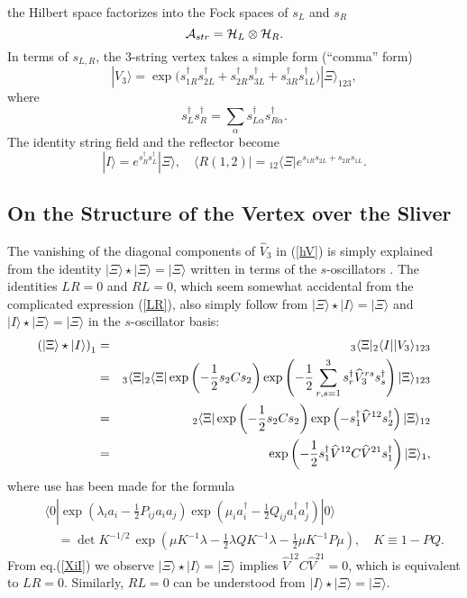\documentclass[a4paper,12pt]{article}
\def\hf{{1\over 2}}
\def\bra{\langle}
\def\ket{\rangle}
\def\lf{\left}
\def\ri{\right}
\def\h#1{\widehat{#1}}
\def\al{\alpha}
\def\tens{\otimes}
\def\sd{s^{\dagger}}
\newcommand{\nn}{\nonumber \\}
\begin{document}
the Hilbert space factorizes into the Fock spaces of $s_L$ and $s_R$
\begin{equation}
{\cal A}_{str}={\cal H}_L\tens {\cal H}_R.
\end{equation}
In terms of $s_{L,R}$, the 3-string vertex takes a simple
form (``comma'' form)
\begin{equation}
|V_3\ket=\exp\Big(\sd_{1R}\sd_{2L}+\sd_{2R}\sd_{3L}+\sd_{3R}\sd_{1L}
\Big)|\Xi\ket_{123} ,
\end{equation}
where
\begin{equation}
 \sd_L\sd_R=\sum_{\al}\sd_{L\al}\sd_{R\al}.
\end{equation}
The identity string field and the reflector become
\begin{equation}
|I\ket=e^{\sd_R\sd_L}|\Xi\ket,\quad 
\bra R(1,2)|={}_{12}\bra\Xi|e^{s_{1R}s_{2L}+s_{2R}s_{1L}}. 
\end{equation}


\subsection{On the Structure of the Vertex over the Sliver}

The vanishing of the diagonal components of $\h{V}_3$
in (\ref{hV}) is simply explained from the
identity
$|\Xi\ket \star |\Xi\ket = |\Xi\ket$ 
written in terms of the
$s$-oscillators
\cite{KosteleckyPotting}.
The identities 
$LR = 0$ and $RL = 0$,
which seem somewhat accidental from the complicated
expression (\ref{LR}),
also simply follow from
$|\Xi\ket \star | I \ket = |\Xi\ket$ and
$| I \ket \star | \Xi \ket = |\Xi\ket$ 
in the $s$-oscillator basis:
\begin{eqnarray}
 \label{XiI}
\lf(|\Xi\ket \star |I\ket \ri)_1
&=&
{}_3\bra \Xi |{}_2\bra I | | V_3 \ket_{123} \nn
&=&
{}_3\bra \Xi |{}_2\bra \Xi|\exp\lf(-\frac{1}{2}s_2 C s_2 \ri)
\exp\lf(-\hf \sum_{r,s=1}^3\sd_r\h{V}^{rs}_3\sd_s\ri) 
|\Xi\ket_{123} \nn
&=&
{}_2\bra \Xi|
\exp\lf(-\frac{1}{2}s_2 C s_2 \ri)
\exp\lf(-s_1^{\dagger}\h{V}^{12}s_2^\dagger\ri) |\Xi\ket_{12} \nn
&=&\exp\lf(-\hf s_1^\dagger \h{V}^{12} C \h{V}^{21} s_1^{\dagger} \ri)
|\Xi\ket_1 ,
\end{eqnarray}
where use has been made for the formula
\begin{eqnarray}
&&\bra 0| 
\exp\lf(\lambda_i a_i -\frac{1}{2} P_{ij} a_i a_j \ri)
\exp\lf(\mu_i a_i^{\dagger} -\frac{1}{2} Q_{ij} a_i^{\dagger} a_j^{\dagger}\ri)
| 0 \ket \nn
&&\quad=
\det K^{-1/2}\,
\exp\lf(\mu K^{-1}\lambda -\frac{1}{2} \lambda Q K^{-1} \lambda
-\frac{1}{2} \mu  K^{-1} P \mu \ri),\quad
K \equiv 1 - PQ.  
\end{eqnarray}
From eq.(\ref{XiI}) we observe
$|\Xi\ket \star |I\ket = |\Xi\ket $ implies
$\h{V}^{12} C \h{V}^{21} = 0$, which is equivalent to 
$LR = 0$.
Similarly, $RL=0$ can be understood from $|I\ket \star |\Xi\ket = |\Xi\ket $.
\end{document}
